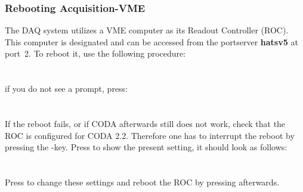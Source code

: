 {{\subsubsection{Rebooting Acquisition-VME \\ }

The DAQ system utilizes a VME computer as its Readout Controller (ROC). This
computer is designated  and can be
accessed from the portserver \textbf{hatsv5} at port~2. To reboot it, use the following 
procedure:\\
\\
\\
if you do not see a prompt, press: \\
\\
\mycomp{-$>$ reboot\\
-$>$ Ctrl $]$ \\
telnet$>$ q \\
epmeas@adaqep.jlab.org$>$\\} 
\\
If the reboot fails, or if CODA afterwards still does not work, 
check that the ROC is configured for CODA 2.2.
Therefore one has to interrupt the reboot by pressing the -key.
Press  to show the present setting, it should look as follows:\\
\\
\\
Press  to change these settings and 
reboot the ROC by pressing  afterwards.

}}
